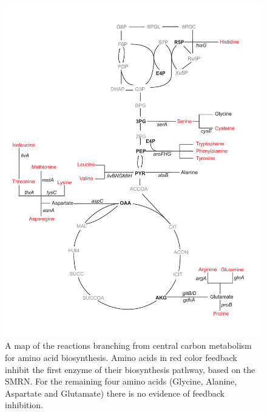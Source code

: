 \documentclass[12pt,a4paper]{article}
\begin{document}
\begin{figure}[ht!]
	\includegraphics[width=\textwidth]{../manuscript/figS7.pdf}
	\caption{A map of the reactions branching from central carbon metabolism for amino acid biosynthesis. Amino acids in red color feedback inhibit the first enzyme of their biosynthesis pathway, based on the SMRN. For the remaining four amino acids (Glycine, Alanine, Aspartate and Glutamate) there is no evidence of feedback inhibition.}\label{fig:SI_biosynthesis}
\end{figure}
\end{document}
